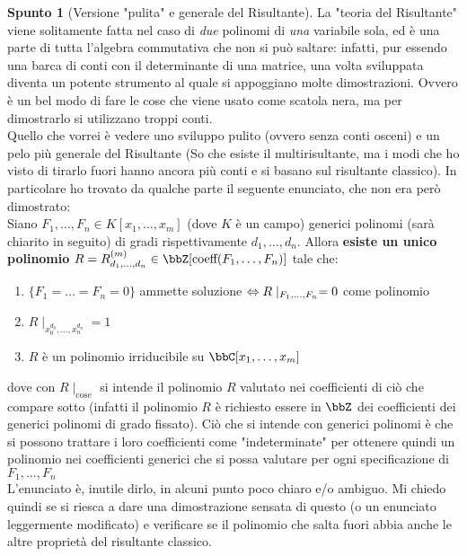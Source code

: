 \documentclass[a4paper,NoNotes,GeneralMath]{stdmdoc}
\theoremstyle{definition}
\newtheorem{spunto}{Spunto}
\begin{document}
	\begin{spunto}[Versione "pulita" e generale del Risultante]
		La "teoria del Risultante" viene solitamente fatta nel caso di {\it due} polinomi di {\it una} variabile sola, ed è una parte di tutta l'algebra commutativa che non si può saltare: infatti, pur essendo una barca di conti con il determinante di una matrice, una volta sviluppata diventa un potente strumento al quale si appoggiano molte dimostrazioni. Ovvero è un bel modo di fare le cose che viene usato come scatola nera, ma per dimostrarlo si utilizzano troppi conti. \\
		Quello che vorrei è vedere uno sviluppo pulito (ovvero senza conti osceni) e un pelo più generale del Risultante (So che esiste il multirisultante, ma i modi che ho visto di tirarlo fuori hanno ancora più conti e si basano sul risultante classico). In particolare ho trovato da qualche parte il seguente enunciato, che non era però dimostrato: \\
		Siano $F_1, \ldots, F_n \in K[x_1, \ldots, x_m]$ (dove $K$ è un campo) generici polinomi (sarà chiarito in seguito) di gradi rispettivamente $d_1, \ldots, d_n$. Allora {\bf esiste un unico polinomio} $R = R_{d_1, \ldots, d_n}^{(m)} \in \bbZ[\text{coeff}(F_1, \ldots, F_n)]$ tale che:
		\begin{enumerate}
			\item $\{F_1 = \ldots = F_n = 0\}$ ammette soluzione $\Leftrightarrow R\mid_{F_1, \ldots, F_n} = 0$ come polinomio
			\item $R\mid_{x_0^{d_0}, \ldots, x_n^{d_n}} = 1$
			\item $R$ è un polinomio irriducibile su $\bbC[x_1, \ldots, x_m]$
		\end{enumerate}
		dove con $R\mid_{\text{cose}}$ si intende il polinomio $R$ valutato nei coefficienti di ciò che compare sotto (infatti il polinomio $R$ è richiesto essere in $\bbZ$ dei coefficienti dei generici polinomi di grado fissato). Ciò che si intende con generici polinomi è che si possono trattare i loro coefficienti come "indeterminate" per ottenere quindi un polinomio nei coefficienti generici che si possa valutare per ogni specificazione di $F_1, \ldots, F_n$ \\
		L'enunciato è, inutile dirlo, in alcuni punto poco chiaro e/o ambiguo. Mi chiedo quindi se si riesca a dare una dimostrazione sensata di questo (o un enunciato leggermente modificato) e verificare se il polinomio che salta fuori abbia anche le altre proprietà del risultante classico.

\end{spunto}
\end{document}
